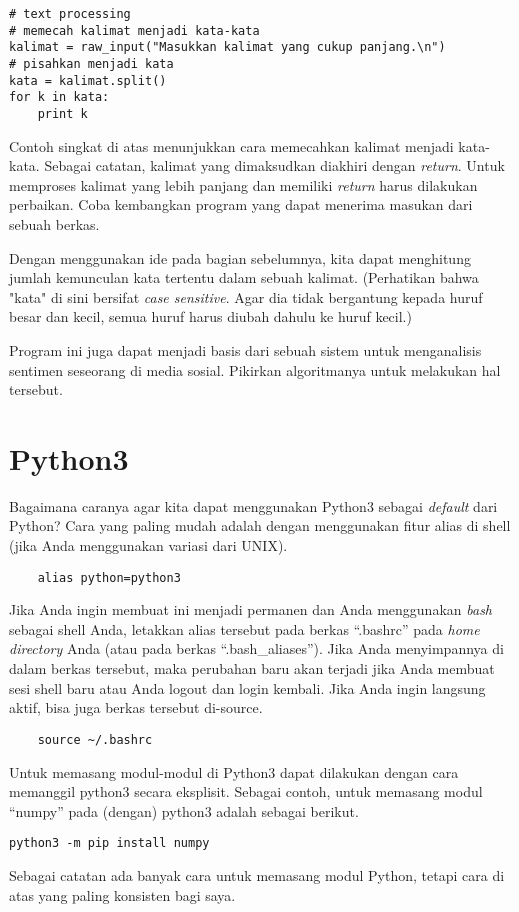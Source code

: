 \begin{verbatim}
# text processing
# memecah kalimat menjadi kata-kata
kalimat = raw_input("Masukkan kalimat yang cukup panjang.\n")
# pisahkan menjadi kata
kata = kalimat.split()
for k in kata:
    print k
\end{verbatim}

Contoh singkat di atas menunjukkan cara memecahkan kalimat menjadi kata-kata.
Sebagai catatan, kalimat yang dimaksudkan diakhiri dengan {\em return}. 
Untuk memproses kalimat yang lebih panjang dan memiliki {\em return} harus 
dilakukan perbaikan.
Coba kembangkan program yang dapat menerima masukan dari sebuah berkas.

Dengan menggunakan ide pada bagian sebelumnya, kita dapat menghitung
jumlah kemunculan kata tertentu dalam sebuah kalimat. (Perhatikan bahwa
"kata" di sini bersifat {\em case sensitive}. Agar dia tidak bergantung
kepada huruf besar dan kecil, semua huruf harus diubah dahulu ke
huruf kecil.)

Program ini juga dapat menjadi basis dari sebuah sistem untuk menganalisis
sentimen seseorang di media sosial. Pikirkan algoritmanya untuk melakukan
hal tersebut.


\section{Python3}
Bagaimana caranya agar kita dapat menggunakan Python3 sebagai {\em default}
dari Python? Cara yang paling mudah adalah dengan menggunakan fitur
alias di shell (jika Anda menggunakan variasi dari UNIX).

\begin{verbatim}
    alias python=python3
\end{verbatim}

Jika Anda ingin membuat ini menjadi permanen dan Anda menggunakan {\em bash}
sebagai shell Anda, letakkan alias tersebut pada berkas ``.bashrc'' pada
{\em home directory} Anda (atau pada berkas ``.bash\_aliases''). 
Jika Anda menyimpannya di dalam berkas tersebut, maka perubahan baru akan 
terjadi jika Anda membuat sesi shell baru atau Anda logout dan login kembali.
Jika Anda ingin langsung aktif, bisa juga berkas tersebut di-source.

\begin{verbatim}
    source ~/.bashrc
\end{verbatim}
    
Untuk memasang modul-modul di Python3 dapat dilakukan dengan cara
memanggil python3 secara eksplisit. Sebagai contoh, untuk memasang
modul ``numpy'' pada (dengan) python3 adalah sebagai berikut.

\begin{verbatim}
python3 -m pip install numpy
\end{verbatim}

Sebagai catatan ada banyak cara untuk memasang modul Python, tetapi
cara di atas yang paling konsisten bagi saya.